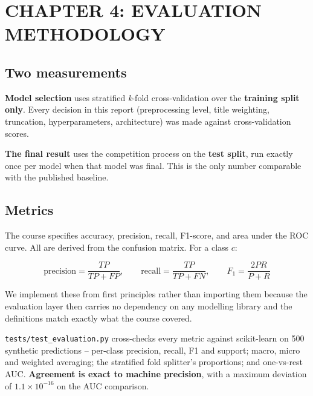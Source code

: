 
\section*{CHAPTER 4: EVALUATION METHODOLOGY}
\setcounter{section}{4}
\setcounter{subsection}{0}
\setcounter{figure}{0}
\setcounter{table}{0}

\subsection{Two measurements}

\textbf{Model selection} uses stratified \textit{k}-fold cross-validation over the \textbf{training split only}. Every decision in this report (preprocessing level, title weighting, truncation, hyperparameters, architecture) was made against cross-validation scores.

\textbf{The final result} uses the competition process on the \textbf{test split}, run exactly once per model when that model was final. This is the only number comparable with the published baseline.

\subsection{Metrics}

The course specifies accuracy, precision, recall, F1-score, and area under the ROC curve. All are derived from the confusion matrix. For a class $c$:

\[ \text{precision} = \frac{TP}{TP + FP}, \qquad \text{recall} = \frac{TP}{TP + FN}, \qquad F_1 = \frac{2PR}{P + R} \]

We implement these from first principles rather than importing them because the evaluation layer then carries no dependency on any modelling library and the definitions match exactly what the course covered.

\texttt{tests/test\_evaluation.py} cross-checks every metric against scikit-learn on 500 synthetic predictions -- per-class precision, recall, F1 and support; macro, micro and weighted averaging; the stratified fold splitter's proportions; and one-vs-rest AUC. \textbf{Agreement is exact to machine precision}, with a maximum deviation of $1.1 \times 10^{-16}$ on the AUC comparison.

